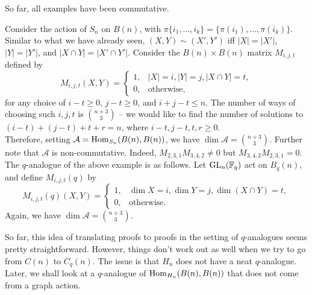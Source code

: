 	 So far, all examples have been commutative.

	 \begin{fex}
	 	\label{ex:non-comm-alg}
	 	Consider the action of $S_n$ on $B(n)$, with $\pi \{i_1,\ldots,i_k\} = \{\pi(i_1),\ldots,\pi(i_k)\}$. Similar to what we have already seen, $(X,Y) \sim (X',Y')$ iff $|X| = |X'|$, $|Y| = |Y'|$, and $|X \cap Y| = |X' \cap Y'|$. Consider the $B(n) \times B(n)$ matrix $M_{i,j,t}$ defined by
	 	\[
	 	M_{i,j,t}(X,Y) =
	 	\begin{cases}
	 		1, & |X|=i, |Y|=j, |X \cap Y| = t, \\ 0, & \text{otherwise,}
	 	\end{cases}
	 	\]
	 	for any choice of $i-t\ge 0$, $j-t\ge 0$, and $i+j-t \le n$. The number of ways of choosing such $i,j,t$ is $\binom{n+3}{3}$ -- we would like to find the number of solutions to $(i-t) + (j-t) + t + r = n$, where $i-t,j-t,t,r \ge 0$.\\
	 	Therefore, setting $\mathcal{A} = \operatorname{Hom}_{S_n}(B(n),B(n))$, we have $\dim \mathcal{A} = \binom{n+3}{3}$. Further note that $\mathcal{A}$ is non-commutative. Indeed, $M_{2,3,1} M_{3,4,2} \ne 0$ but $M_{3,4,2} M_{2,3,1} = 0$.\\

	 	The $q$-analogue of the above example is as follows. Let $\operatorname{GL}_n(\mathbb{F}_q)$ act on $B_q(n)$, and define $M_{i,j,t}(q)$ by
	 	\[ M_{i,j,t}(q)(X,Y) = \begin{cases} 1, & \dim X = i, \dim Y = j, \dim (X \cap Y) = t, \\ 0, & \text{otherwise.} \end{cases} \]
	 	Again, we have $\dim \mathcal{A} = \binom{n+3}{3}$.
	 \end{fex}

	So far, this idea of translating proofs to proofs in the setting of $q$-analogues seems pretty straightforward. However, things don't work out as well when we try to go from $C(n)$ to $C_q(n)$. The issue is that $H_n$ does not have a neat $q$-analogue. Later, we shall look at a $q$-analogue of $\operatorname{Hom}_{H_n}(B(n),B(n))$ that does not come from a graph action.

